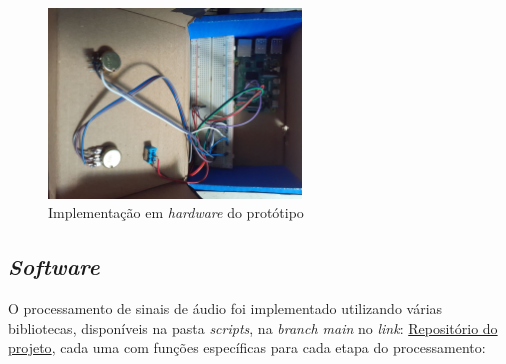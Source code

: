 
\begin{figure}[h]
    \centering
    \includegraphics[width=0.6\textwidth]{figuras/fig99.jpg}
    \caption{Implementação em \textit{hardware} do protótipo}
    \label{fig99}
\end{figure}
 
\subsection{\textit{Software}}

O processamento de sinais de áudio foi implementado utilizando várias bibliotecas, disponíveis na pasta \textit{scripts}, na \textit{branch main} no \textit{link}: \href{https://github.com/joselitopradomarques/tcc}{Repositório do projeto}, cada uma com funções específicas para cada etapa do processamento: %

